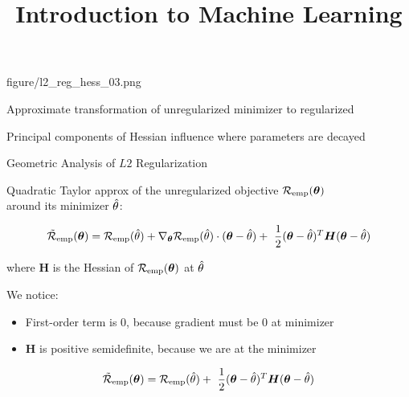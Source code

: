 \documentclass[11pt,compress,t,notes=noshow, xcolor=table]{beamer}
\title{Introduction to Machine Learning}
\begin{document}
{figure/l2_reg_hess_03.png} {
  \item Approximate transformation of unregularized minimizer to regularized 
  \item Principal components of Hessian influence where parameters are decayed  
}

\begin{vbframe}{Geometric Analysis of $L2$ Regularization}

Quadratic Taylor approx of the unregularized objective $\mathcal{R}_{\text{emp}}(\bm{\theta})$ \\
around its minimizer $\hat{\theta}$:

$$ \mathcal{\tilde R}_{\text{emp}}(\bm{\theta})= \mathcal{R}_{\text{emp}}(\hat{\theta}) + \nabla_{\bm{\theta}} \mathcal{R}_{\text{emp}}(\hat{\theta})\cdot(\bm{\theta} - \hat{\theta}) + \ \frac{1}{2} (\bm{\theta} - \hat{\theta})^T \bm{H} (\bm{\theta} - \hat{\theta}) $$

where $\bm{H}$ is the Hessian of $\mathcal{R}_{\text{emp}}(\bm{\theta})$ at $\hat{\theta}$

\lz \lz 

We notice:

\begin{itemize}
  \item First-order term is 0, because gradient must be $0$ at minimizer
  \item $\bm{H}$ is positive semidefinite, because we are at the minimizer
\end{itemize}


$$ \mathcal{\tilde R}_{\text{emp}}(\thetav)= \mathcal{R}_{\text{emp}}(\thetah) + \ \frac{1}{2} (\thetav - \thetah)^T \bm{H} (\thetav - \thetah) $$


\lz

\end{vbframe}
\end{document}
